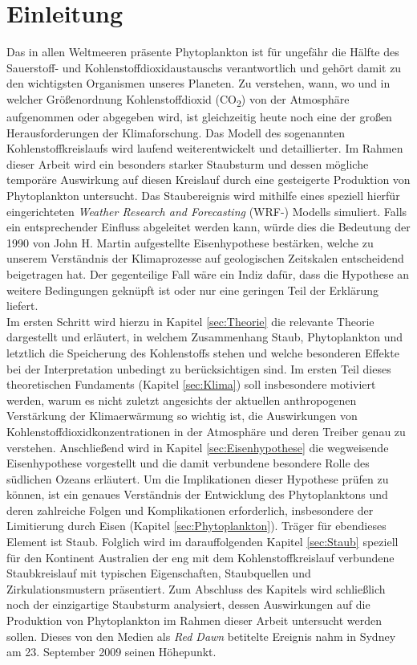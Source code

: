 \documentclass[12pt,a4paper,onecolumn]{scrartcl}
\newcommand{\cotwo}{CO\textsubscript{2}}
\begin{document}
\section{Einleitung} \label{sec:einleitung}
Das in allen Weltmeeren präsente Phytoplankton ist für ungefähr die Hälfte des Sauerstoff- und Kohlenstoffdioxidaustauschs verantwortlich \citep{Emerson.2009} und gehört damit zu den wichtigsten Organismen unseres Planeten. Zu verstehen, wann, wo und in welcher Größenordnung Kohlenstoffdioxid (\cotwo) von der Atmosphäre aufgenommen oder abgegeben wird, ist gleichzeitig heute noch eine der großen Herausforderungen der Klimaforschung. Das Modell des sogenannten Kohlenstoffkreislaufs wird laufend weiterentwickelt und detaillierter. Im Rahmen dieser Arbeit wird ein besonders starker Staubsturm und dessen mögliche temporäre Auswirkung auf diesen Kreislauf durch eine gesteigerte Produktion von Phytoplankton untersucht. Das Staubereignis wird mithilfe eines speziell hierfür eingerichteten \textit{Weather Research and Forecasting} (WRF-) Modells simuliert. Falls ein entsprechender Einfluss abgeleitet werden kann, würde dies  die Bedeutung der 1990 von John H. Martin aufgestellte Eisenhypothese bestärken, welche zu unserem Verständnis der Klimaprozesse auf geologischen Zeitskalen entscheidend beigetragen hat. Der gegenteilige Fall wäre ein Indiz dafür, dass die Hypothese an weitere Bedingungen geknüpft ist oder nur eine geringen Teil der Erklärung liefert.  \\

Im ersten Schritt wird hierzu in Kapitel \ref{sec:Theorie} die relevante Theorie dargestellt und erläutert, in welchem Zusammenhang Staub, Phytoplankton und letztlich die Speicherung des Kohlenstoffs stehen und welche besonderen Effekte bei der Interpretation unbedingt zu berücksichtigen sind. Im ersten Teil dieses theoretischen Fundaments (Kapitel  \ref{sec:Klima}) soll insbesondere motiviert werden, warum es nicht zuletzt angesichts der aktuellen anthropogenen Verstärkung der Klimaerwärmung so wichtig ist, die Auswirkungen von Kohlenstoffdioxidkonzentrationen in der Atmosphäre und deren Treiber genau zu verstehen. Anschließend wird in Kapitel \ref{sec:Eisenhypothese} die wegweisende Eisenhypothese \citep{Martin.1990} vorgestellt und die damit verbundene besondere Rolle des südlichen Ozeans erläutert. Um die Implikationen dieser Hypothese prüfen zu können, ist ein genaues Verständnis der Entwicklung des Phytoplanktons und deren zahlreiche Folgen und Komplikationen erforderlich, insbesondere der Limitierung durch Eisen  (Kapitel \ref{sec:Phytoplankton}). Träger für ebendieses Element ist Staub. Folglich wird im darauffolgenden Kapitel \ref{sec:Staub} speziell für den Kontinent Australien der eng mit dem Kohlenstoffkreislauf verbundene Staubkreislauf mit typischen Eigenschaften, Staubquellen und Zirkulationsmustern  präsentiert. Zum Abschluss des Kapitels wird schließlich noch der einzigartige Staubsturm analysiert, dessen Auswirkungen auf die Produktion von Phytoplankton im Rahmen dieser Arbeit untersucht werden sollen. Dieses von den Medien als \textit{Red Dawn} betitelte Ereignis nahm in Sydney am 23. September 2009 seinen Höhepunkt. \\
\end{document}
